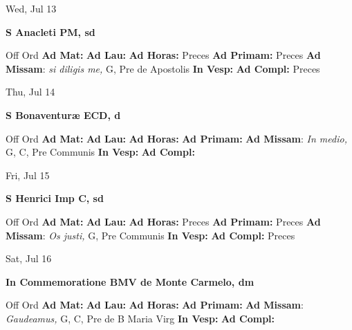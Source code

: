 \documentclass[10pt]{article}
\begin{document}
\begin{minipage}{3.5in}
\vspace{2em}\begin{center}
Wed, Jul 13
\end{center}\textbf{ \large S Anacleti PM, \textnormal{\normalsize sd}}
\begin{justify}
Off Ord
\textbf{Ad Mat: }
\textbf{Ad Lau: }
\textbf{Ad Horas: }Preces
\textbf{Ad Primam: }Preces
\textbf{Ad Missam}: \textit{si diligis me,} G, Pre de Apostolis
\textbf{In Vesp: }
\textbf{Ad Compl: }Preces\end{justify}
\end{minipage}



\begin{minipage}{3.5in}
\vspace{2em}\begin{center}
Thu, Jul 14
\end{center}\textbf{ \large S Bonaventuræ ECD, \textnormal{\normalsize d}}
\begin{justify}
Off Ord
\textbf{Ad Mat: }
\textbf{Ad Lau: }
\textbf{Ad Horas: }
\textbf{Ad Primam: }
\textbf{Ad Missam}: \textit{In medio,} G, C, Pre Communis
\textbf{In Vesp: }
\textbf{Ad Compl: }\end{justify}
\end{minipage}



\begin{minipage}{3.5in}
\vspace{2em}\begin{center}
Fri, Jul 15
\end{center}\textbf{ \large S Henrici Imp C, \textnormal{\normalsize sd}}
\begin{justify}
Off Ord
\textbf{Ad Mat: }
\textbf{Ad Lau: }
\textbf{Ad Horas: }Preces
\textbf{Ad Primam: }Preces
\textbf{Ad Missam}: \textit{Os justi,} G, Pre Communis
\textbf{In Vesp: }
\textbf{Ad Compl: }Preces\end{justify}
\end{minipage}



\begin{minipage}{3.5in}
\vspace{2em}\begin{center}
Sat, Jul 16
\end{center}\textbf{ \large In Commemoratione BMV de Monte Carmelo, \textnormal{\normalsize dm}}
\begin{justify}
Off Ord
\textbf{Ad Mat: }
\textbf{Ad Lau: }
\textbf{Ad Horas: }
\textbf{Ad Primam: }
\textbf{Ad Missam}: \textit{Gaudeamus,} G, C, Pre  de B Maria Virg
\textbf{In Vesp: }
\textbf{Ad Compl: }\end{justify}
\end{minipage}
\end{document}
